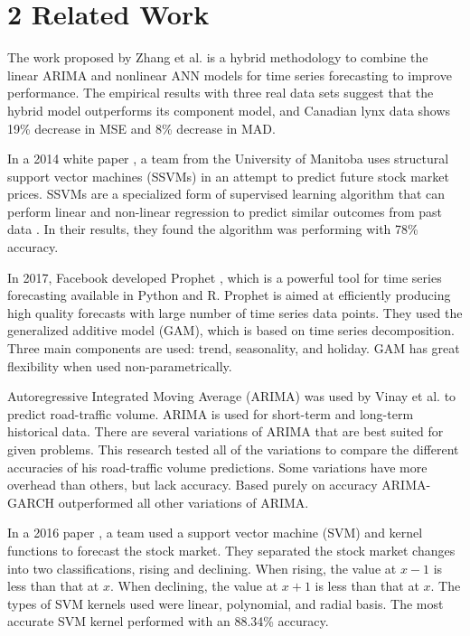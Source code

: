 \documentclass[letterpaper]{article} %
\begin{document}
\section{2 Related Work }

The work proposed by Zhang et al. \cite{zhang} is a hybrid methodology to combine the linear ARIMA and nonlinear ANN models for time series forecasting to improve performance. The empirical results with three real data sets suggest that the hybrid model outperforms its component model, and Canadian lynx data shows 19\% decrease in MSE and 8\% decrease in MAD.
\par
In a 2014 white paper \cite{leung}, a team from the University of Manitoba uses structural support vector machines (SSVMs) in an attempt to predict future stock market prices. SSVMs are a specialized form of supervised learning algorithm that can perform linear and non-linear regression to predict similar outcomes from past data \cite{tsochan}. In their results, they found the algorithm was performing with 78\% accuracy.
\par
In 2017, Facebook developed Prophet \cite{taylor}, which is a powerful tool for time series forecasting available in Python and R. Prophet is aimed at efficiently producing high quality forecasts with large number of time series data points. They used the generalized additive model (GAM), which is based on time series decomposition. Three main components are used: trend, seasonality, and holiday. GAM has great flexibility when used non-parametrically.
\par
Autoregressive Integrated Moving Average (ARIMA) was used by Vinay et al. \cite{vinay} to predict road-traffic volume. ARIMA is used for short-term and long-term historical data. There are several variations of ARIMA that are best suited for given problems. This research tested all of the variations to compare the different accuracies of his road-traffic volume predictions. Some variations have more overhead than others, but lack accuracy. Based purely on accuracy ARIMA-GARCH outperformed all other variations of ARIMA.
\par
In a 2016 paper \cite{ved}, a team used a support vector machine (SVM) and kernel functions to forecast the stock market. They separated the stock market changes into two classifications, rising and declining. When rising, the value at $x-1$ is less than that at $x$. When declining, the value at $x+1$ is less than that at $x$. The types of SVM kernels used were linear, polynomial, and radial basis. The most accurate SVM kernel performed with an 88.34\% accuracy.
\end{document}
